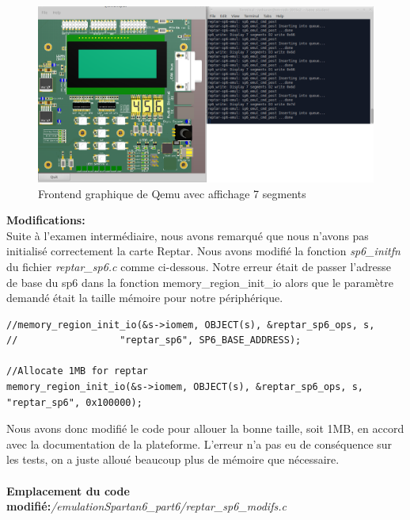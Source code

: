 \begin{figure}[H]
	\begin{center}
		\includegraphics[width=15cm]{img/emulation2.png}
		\caption{Frontend graphique de Qemu avec affichage 7 segments}
		\label{emulation2}
	\end{center}
\end{figure}
\textbf{\color{red}Modifications:\color{black}}\\ Suite à l'examen intermédiaire, nous avons remarqué que nous n'avons pas initialisé correctement la carte Reptar. Nous avons modifié la fonction \textit{sp6\_initfn} du fichier \textit{reptar\_sp6.c} comme ci-dessous. Notre erreur était de passer l'adresse de base du sp6 dans la fonction memory\_region\_init\_io alors que le paramètre demandé était la taille mémoire pour notre périphérique. 
\begin{lstlisting}
//memory_region_init_io(&s->iomem, OBJECT(s), &reptar_sp6_ops, s,
//                  "reptar_sp6", SP6_BASE_ADDRESS);

//Allocate 1MB for reptar
memory_region_init_io(&s->iomem, OBJECT(s), &reptar_sp6_ops, s,
"reptar_sp6", 0x100000);
\end{lstlisting}
Nous avons donc modifié le code pour allouer la bonne taille, soit 1MB, en accord avec la documentation de la plateforme. L'erreur n'a pas eu de conséquence sur les tests, on a juste alloué beaucoup plus de mémoire que nécessaire.\\\\
\textbf{\color{red}Emplacement du code modifié:\color{black}}\textit{/emulationSpartan6\_part6/reptar\_sp6\_modifs.c}
